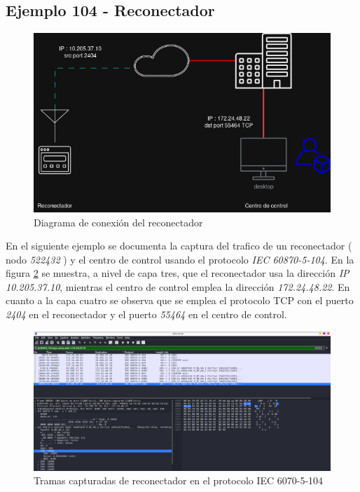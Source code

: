 \documentclass[a5paper]{book}%
\begin{document}
\subsection{Ejemplo 104 - Reconectador}

\begin{figure}[H]
	\centering
	\caption{Diagrama de conexión del reconectador}
	\label{fig:reco104diagrama}
	\includegraphics[width=0.7\linewidth]{reco_104_diagrama}
\end{figure}

En el siguiente ejemplo se documenta la captura del trafico de un reconectador ( nodo \textit{522432} ) y el centro de control usando el protocolo \textit{IEC 60870-5-104}. En la figura \ref{fig:reco104} se muestra, a nivel de capa tres, que el reconectador usa la dirección \textit{IP 10.205.37.10}, mientras el centro de control emplea la dirección \textit{172.24.48.22}. En cuanto a la capa cuatro se observa que se emplea el protocolo TCP  con el puerto \textit{2404} en el reconectador y el puerto \textit{55464} en el centro de control. 

\begin{figure}[H]
	\centering
	\caption{Tramas capturadas de reconectador en el protocolo IEC 6070-5-104}
	\label{fig:reco104}
	\includegraphics[width=\linewidth]{reco_104}
\end{figure}
\end{document}
